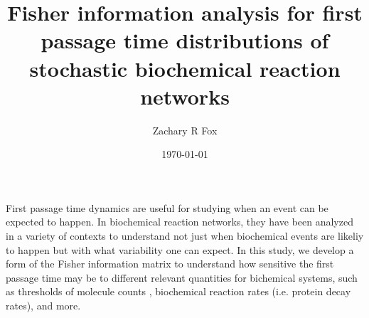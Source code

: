 \documentclass[aps,prl,preprint,groupedaddress]{revtex4-1}
\begin{document}

\title{Fisher information analysis for first passage time distributions of stochastic biochemical reaction networks}


\author{Zachary R Fox}
\affiliation{}


\date{\today}

\begin{abstract}
\end{abstract}

\pacs{}

\maketitle

First passage time dynamics are useful for studying when an event can be expected to happen. In biochemical reaction networks, they have been analyzed in a variety of contexts \cite{Ghusinga,Munsky,Paullson} to understand not just when biochemical events are likeliy to happen but with what variability one can expect. In this study, we develop a form of the Fisher information matrix to understand how sensitive the first passage time may be to different relevant quantities for bichemical systems, such as thresholds of molecule counts \cite{Ghusinga,Paullson}, biochemical reaction rates (i.e. protein decay rates), and more.
\end{document}
